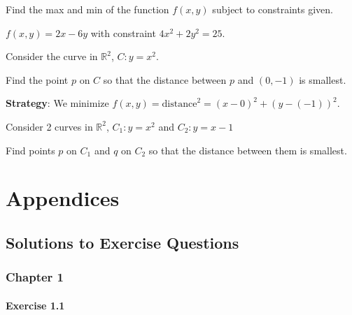 \documentclass[11pt,fleqn]{book} %
\begin{document}
\begin{exercise}
    Find the max and min of the function $f(x, y)$ subject to constraints given.

    $f(x,y) = 2x - 6y$ with constraint $4x^2 + 2y^2 = 25$. 
\end{exercise}

\begin{exercise}
    Consider the curve in $\mathbb{R}^2$, $C: y = x^2$. 

    Find the point $p$ on $C$ so that the distance between $p$ and $(0, -1)$ is smallest.

    \textbf{Strategy}: We minimize $f(x, y) = \text{distance}^2 = (x - 0)^2 + (y -(-1))^2$.
\end{exercise}

\begin{exercise}
    Consider 2 curves in $\mathbb{R}^2$, $C_1: y = x^2$ and $C_2: y = x - 1$

    Find points $p$ on $C_1$ and $q$ on $C_2$ so that the distance between them is smallest.
\end{exercise}


\part{Appendices}


\chapter*{Solutions to Exercise Questions}
\setlength{\parindent}{0pt} %

\section*{Chapter 1}

\subsection*{Exercise 1.1}
\end{document}
